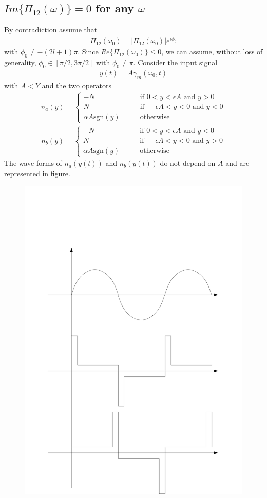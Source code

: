 \documentclass[a4paper,10pt]{article}
\newcommand{\w}{\omega}
\newcommand{\real}{Re}
\newcommand{\sgn}{\mathrm{sgn}}
\newcommand{\eps}{\epsilon}
\begin{document}
\subsection{$Im\{\Pi_{12}(\w)\} = 0$ for any $\w$}
By contradiction assume that
\begin{align}
	\Pi_{12}(\w_0)=|\Pi_{12}(\w_0)|e^{i\phi_0}
\end{align}
with $\phi_0 \neq -(2l+1)\pi$. Since $\real\{\Pi_{12}(\w_0)\}\leq 0$, we can assume, without loss of generality, $\phi_0 \in [\pi/2,3\pi/2]$ with $\phi_0\neq \pi$.
Consider the input signal
\begin{align}
	y(t)=A\gamma_m(\w_0,t)
\end{align}
with $A<Y$ and the two operators
\begin{align}
	n_a(y)=
		\left\{\begin{array}{ll}
			-N	& \qquad \text{if } 0<y<\eps A \text{ and } \dot y>0\\
			N	& \qquad \text{if } -\eps A<y<0 \text{ and } \dot y<0\\
			\alpha A\sgn(y) & \qquad \text{otherwise}
		\end{array}\right.
\end{align}
\begin{align}
	n_b(y)=
		\left\{\begin{array}{ll}
			-N	& \qquad \text{if } 0<y<\eps A \text{ and } \dot y<0\\
			N	& \qquad \text{if } -\eps A<y<0 \text{ and } \dot y>0\\
			\alpha A\sgn(y) & \qquad \text{otherwise}
		\end{array}\right.
\end{align}
The wave forms of $n_a(y(t))$ and $n_b(y(t))$ do not depend on $A$ and are represented in figure.
\begin{figure}
	\centering
	\includegraphics[width=0.7\columnwidth]{PhaseDestroying}
\end{figure}
\end{document}
